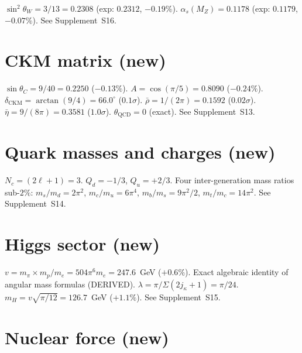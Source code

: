 \documentclass[11pt,letterpaper]{article}
\numberwithin{equation}{section}
\begin{document}
$\sin^2\theta_W = 3/13 = 0.2308$ (exp: $0.2312$, $-0.19\%$).
$\alpha_s(M_Z) = 0.1178$ (exp: $0.1179$, $-0.07\%$).
See Supplement~S16.

\section{CKM matrix (new)}
\label{sec:ckm}

$\sin\theta_C = 9/40 = 0.2250$ ($-0.13\%$).
$A = \cos(\pi/5) = 0.8090$ ($-0.24\%$).
$\delta_\mathrm{CKM} = \arctan(9/4) = 66.0^\circ$ ($0.1\sigma$).
$\bar\rho = 1/(2\pi) = 0.1592$ ($0.02\sigma$).
$\bar\eta = 9/(8\pi) = 0.3581$ ($1.0\sigma$).
$\theta_\mathrm{QCD} = 0$ (exact).
See Supplement~S13.

\section{Quark masses and charges (new)}
\label{sec:quarks}

$N_c = (2\ell+1) = 3$. $Q_d = -1/3$, $Q_u = +2/3$.
Four inter-generation mass ratios sub-$2\%$:
$m_s/m_d = 2\pi^2$, $m_c/m_u = 6\pi^4$,
$m_b/m_s = 9\pi^2/2$, $m_t/m_c = 14\pi^2$.
See Supplement~S14.

\section{Higgs sector (new)}
\label{sec:higgs}

$v = m_\pi \times m_p / m_e = 504\pi^6 m_e = 247.6$~GeV ($+0.6\%$).
Exact algebraic identity of angular mass formulas (DERIVED).
$\lambda = \pi/\Sigma(2j_\kappa+1) = \pi/24$. $m_H = v\sqrt{\pi/12} = 126.7$~GeV ($+1.1\%$).
See Supplement~S15.

\section{Nuclear force (new)}
\label{sec:nuclear}
\end{document}
